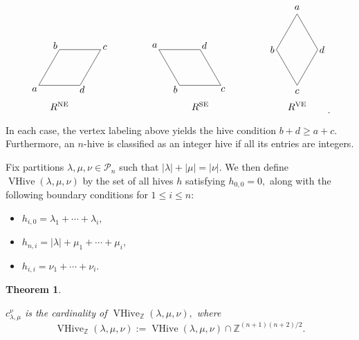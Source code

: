 \documentclass[11pt,reqno]{amsart}
\newcommand\Par{\mathscr{P}}
\newtheorem{theorem}{Theorem}
\DeclareMathOperator{\VHive}{VHive}
\DeclareMathOperator{\NE}{NE}
\DeclareMathOperator{\SE}{SE}
\DeclareMathOperator{\VE}{VE}
\begin{document}
$$ 
\begin{tikzpicture}[scale=1.5]
  \draw (0,0) -- (1,0);
  \draw (0,0) -- (0.5, 0.5*1.732);
  \draw (0.5, 0.5*1.732) -- (1.5, 0.5*1.732);
  \draw (1,0) -- (1.5,0.5*1.732);
  \node at (0.5,-0.5) {$R^{\NE}$};
  \node at (-0.1,-0.1) {$a$};
  \node at (0.5-0.1, 0.5*1.732+0.1) {$b$};
  \node at (1.5+0.1, 0.5*1.732+0.05) {$c$};
  \node at (1+0.05,0-0.1) {$d$};
\end{tikzpicture}   \quad \quad \quad \quad 
\begin{tikzpicture}[scale=1.5]
  \draw (0,0) -- (1,0);
  \draw (0,0) -- (-0.5, 0.5*1.732);
  \draw (-0.5, 0.5*1.732) -- (0.5, 0.5*1.732);
  \draw (1,0) -- (0.5,0.5*1.732);
  \node at (0.5,-0.5) {$R^{\SE}$};
  \node at (-0.1,-0.1) {$b$};
  \node at (-0.5-0.1, 0.5*1.732+0.1) {$a$};
  \node at (0.5+0.1, 0.5*1.732+0.1) {$d$};
  \node at (1+0.05,0-0.1) {$c$};
\end{tikzpicture}   \quad \quad \quad \quad 
\begin{tikzpicture}[scale=1.5]
  \draw (0,0) -- (0.5,0.5*1.732);
  \draw (1,0) -- (0.5,0.5*1.732);
  \draw (0.5,-0.5*1.732) -- (0,0);
  \draw (0.5,-0.5*1.732) -- (1,0);
  \node at (0.5,-0.5*1.732-0.5) {$R^{\VE}$};
  \node at (-0.1,0) {$b$};
  \node at (0.5,0.5*1.732+0.15) {$a$};
  \node at (1+0.1,0) {$d$};
  \node at (0.5,-0.5*1.732-0.15) {$c$};
\end{tikzpicture}.$$
In each case, the vertex labeling above yields the hive condition $b + d \geq a + c$. Furthermore, an $n$-hive is classified as an integer hive if all its entries are integers.

Fix partitions $\lambda,\mu,\nu \in \Par_n $ such that $|\lambda| + |\mu| = |\nu|$. We then define $\VHive(\lambda,\mu,\nu)$ by the set of all hives $h$ satisfying $h_{0,0}=0,$ along with the following boundary conditions for $1 \leq i \leq n$:
\begin{itemize}
    \item $h_{i,0}=\lambda_1 + \cdots +\lambda_i,$
    \item $h_{n,i}=|\lambda|+ \mu_1 + \cdots + \mu_i,$
    \item $h_{i,i}=\nu_1 + \cdots + \nu_i$.
\end{itemize}
\begin{theorem}
\begin{upshape}
    \cite{Buch:saturation, Mrigendra:saturation}
\end{upshape}
$c_{\lambda,\mu}^{\nu}$ is the cardinality of $\VHive_{\mathbb{Z}}(\lambda,\mu,\nu),$ where $$\VHive_{\mathbb{Z}}(\lambda,\mu,\nu):=\VHive(\lambda,\mu,\nu) \cap \mathbb{Z}^{(n+1)(n+2)/2}.$$      
\end{theorem}
\end{document}
